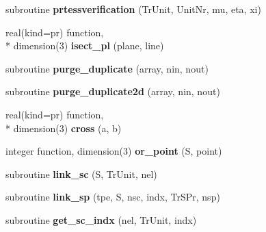 \begin{DoxyCompactItemize}
\item 
\hypertarget{classtracking__routines_a2737eff6fc3d1e167bf06479e40a49e5}{subroutine {\bfseries prtessverification} (Tr\-Unit, Unit\-Nr, mu, eta, xi)}\label{classtracking__routines_a2737eff6fc3d1e167bf06479e40a49e5}

\item 
\hypertarget{classtracking__routines_a4a27df4391e12cb707ca533509795103}{real(kind=pr) function, \\*
dimension(3) {\bfseries isect\-\_\-pl} (plane, line)}\label{classtracking__routines_a4a27df4391e12cb707ca533509795103}

\item 
\hypertarget{classtracking__routines_aae681a6b8f4dbb6e05dbdc58c4f94019}{subroutine {\bfseries purge\-\_\-duplicate} (array, nin, nout)}\label{classtracking__routines_aae681a6b8f4dbb6e05dbdc58c4f94019}

\item 
\hypertarget{classtracking__routines_aad61af40384e51ae6b40895548de50cf}{subroutine {\bfseries purge\-\_\-duplicate2d} (array, nin, nout)}\label{classtracking__routines_aad61af40384e51ae6b40895548de50cf}

\item 
\hypertarget{classtracking__routines_af1c33e001b61da5d7a3e2f56704adb75}{real(kind=pr) function, \\*
dimension(3) {\bfseries cross} (a, b)}\label{classtracking__routines_af1c33e001b61da5d7a3e2f56704adb75}

\item 
\hypertarget{classtracking__routines_a14768dcbd966ad63cfd8da92488509f6}{integer function, dimension(3) {\bfseries or\-\_\-point} (S, point)}\label{classtracking__routines_a14768dcbd966ad63cfd8da92488509f6}

\item 
\hypertarget{classtracking__routines_af775b6bb9ab67c4bafde342e76e575ee}{subroutine {\bfseries link\-\_\-sc} (S, Tr\-Unit, nel)}\label{classtracking__routines_af775b6bb9ab67c4bafde342e76e575ee}

\item 
\hypertarget{classtracking__routines_a205cbbd3b4519291d9e37ea96ab438af}{subroutine {\bfseries link\-\_\-sp} (tpe, S, nsc, indx, Tr\-S\-Pr, nsp)}\label{classtracking__routines_a205cbbd3b4519291d9e37ea96ab438af}

\item 
\hypertarget{classtracking__routines_acd2c9c52f513ee8a9d1a43f98a4ab23f}{subroutine {\bfseries get\-\_\-sc\-\_\-indx} (nel, Tr\-Unit, indx)}\label{classtracking__routines_acd2c9c52f513ee8a9d1a43f98a4ab23f}


\end{DoxyCompactItemize}
